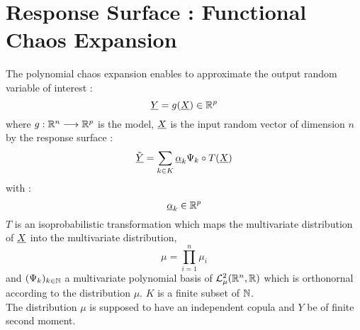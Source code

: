 

\newpage

\section{Response Surface : Functional Chaos Expansion}
The polynomial chaos expansion enables to approximate the output random variable of interest :
\begin{equation}\label{Model}
{\underline{Y}} = g({\underline{X}}) \in {\mathbb R}^p
\end{equation}
where  $g : {\mathbb R}^n \longrightarrow {\mathbb R}^p $ is the model, ${\underline{X}}$ is the input random vector of dimension $n$ by the  response surface :
\begin{equation}\label{metaModel}
\tilde{{\underline{Y}}} = \sum_{k \in K} {\underline{\alpha}}_k \Psi_k \circ T({\underline{X}})
\end{equation}
with :
\begin{equation}\label{coeff}
{\underline{\alpha}}_k \in {\mathbb R}^p
\end{equation}
$T$ is an isoprobabilistic transformation which maps the multivariate distribution of ${\underline{X}}$ into the multivariate distribution,
\begin{equation}\label{mudist}
\mu = \prod_{i=1}^n \mu_i
\end{equation}
and  $(\Psi_k)_{k \in {\mathbb N}}$ a multivariate polynomial basis of ${\mathcal L}^2_{\mu}({\mathbb R}^n,{\mathbb R})$ which is orthonornal according to the distribution $\mu$. $K$ is a finite subset of ${\mathbb N}$. \\
The distribution $\mu$ is supposed to have an independent copula and $Y$ be of finite second moment.

